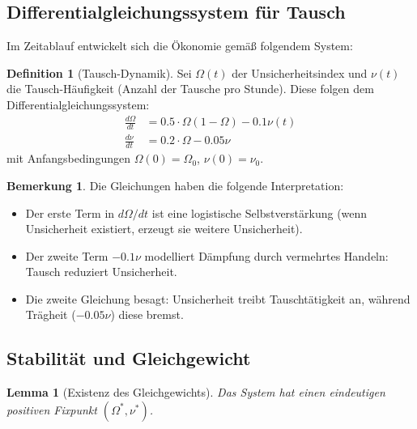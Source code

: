 \documentclass[a4paper, 12pt, twoside, openright]{report}
\newtheorem{lemma}[theorem]{Lemma}
\theoremstyle{definition}
\newtheorem{definition}[theorem]{Definition}
\theoremstyle{definition}
\newtheorem{bemerkung}{Bemerkung}[chapter]
\begin{document}
\subsection{Differentialgleichungssystem für Tausch}

Im Zeitablauf entwickelt sich die Ökonomie gemäß folgendem System:

\begin{definition}[Tausch-Dynamik]
    Sei $\Omega(t)$ der Unsicherheitsindex und $\nu(t)$ die Tausch-Häufigkeit (Anzahl der Tausche pro Stunde). Diese folgen dem Differentialgleichungssystem:
    \begin{align}
        \frac{d\Omega}{dt} &= 0.5 \cdot \Omega(1-\Omega) - 0.1 \nu(t) \\
        \frac{d\nu}{dt} &= 0.2 \cdot \Omega - 0.05 \nu
    \end{align}
    mit Anfangsbedingungen $\Omega(0) = \Omega_0$, $\nu(0) = \nu_0$.
\end{definition}

\begin{bemerkung}
    Die Gleichungen haben die folgende Interpretation:
    \begin{itemize}
        \item Der erste Term in $d\Omega/dt$ ist eine logistische Selbstverstärkung (wenn Unsicherheit existiert, erzeugt sie weitere Unsicherheit).
        \item Der zweite Term $-0.1\nu$ modelliert Dämpfung durch vermehrtes Handeln: Tausch reduziert Unsicherheit.
        \item Die zweite Gleichung besagt: Unsicherheit treibt Tauschtätigkeit an, während Trägheit ($-0.05\nu$) diese bremst.
    \end{itemize}
\end{bemerkung}

\subsection{Stabilität und Gleichgewicht}

\begin{lemma}[Existenz des Gleichgewichts]
    Das System hat einen eindeutigen positiven Fixpunkt $(\Omega^*, \nu^*)$.
\end{lemma}
\end{document}
